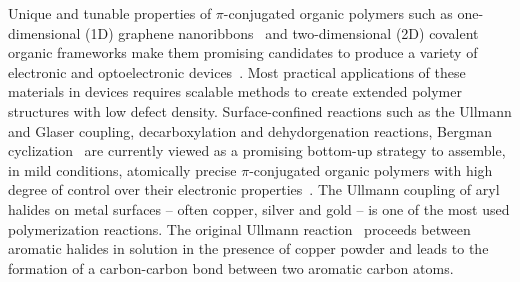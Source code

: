 \documentclass[journal=jacsat,manuscript=article]{achemso}
\newcommand{\lock}{\color{red}}
\newcommand{\lock}{\color{black}}
\newcommand{\comm}{\color{ForestGreen}} %
\begin{document}
{\lock


Unique and tunable properties of $\pi$-conjugated organic polymers such as one-dimensional (1D) graphene nanoribbons~\cite{ullmann_106, ullmann_45, ullmann_107, ullmann_101}
and two-dimensional (2D) covalent organic frameworks 
make them promising candidates to produce a variety of electronic and optoelectronic devices~\cite{ullmann_113, ullmann_114}.
%
Most practical applications of these materials in devices requires scalable methods to create extended polymer structures with low defect density.
%
Surface-confined reactions such as the Ullmann and Glaser coupling, decarboxylation and dehydorgenation reactions, Bergman cyclization~\cite{ullmann_140}
are currently viewed as a promising bottom-up strategy to assemble, in mild conditions, atomically precise $\pi$-conjugated organic polymers with high degree of control over their electronic properties~\cite{ullmann_33}. 
%
%
The Ullmann coupling of aryl halides on metal surfaces -- often copper, silver and gold -- is one of the most used polymerization reactions. 
%
The original Ullmann reaction~\cite{ullmann_01} proceeds between aromatic halides in solution in the presence of copper powder and leads to the formation of a carbon-carbon bond between two aromatic carbon atoms. 
%
}
\end{document}
